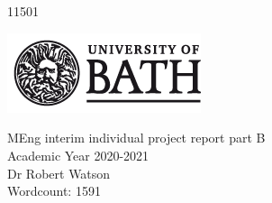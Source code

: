 \begin{titlepage}
	\begin{center}
	\vspace*{2cm}
	\Huge
	\textbf{\thetitle}\\
	\vspace{2cm}
	\LARGE
	\textbf{\theauthor}\\
	11501
	
	\vspace{2cm}
	
	\includegraphics{../figures/uob-logo-black-transparent}
	
	\vspace{3cm}
	
	MEng interim individual project report part B\\
	\vfill
	Academic Year 2020-2021\\
	Dr Robert Watson\\
	
	Wordcount: 1591
	\end{center}
	
\end{titlepage}
